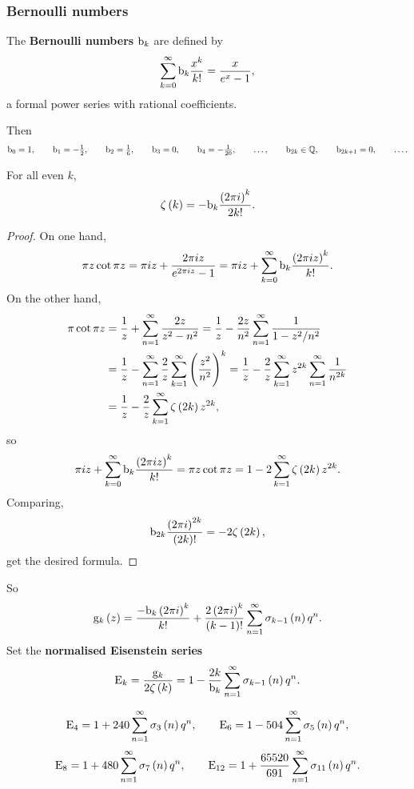 \subsubsection{Bernoulli numbers}

\begin{definition}
The \textbf{Bernoulli numbers} $ \mathrm{b}_k $ are defined by
$$ \sum_{k = 0}^\infty \mathrm{b}_k\dfrac{x^k}{k!} = \dfrac{x}{e^x - 1}, $$
a formal power series with rational coefficients.
\end{definition}

Then
$$ \mathrm{b}_0 = 1, \qquad \mathrm{b}_1 = -\tfrac{1}{2}, \qquad \mathrm{b}_2 = \tfrac{1}{6}, \qquad \mathrm{b}_3 = 0, \qquad \mathrm{b}_4 = -\tfrac{1}{20}, \qquad \dots, \qquad \mathrm{b}_{2k} \in \mathbb{Q}, \qquad \mathrm{b}_{2k + 1} = 0, \qquad \dots. $$

\pagebreak

\begin{proposition}
For all even $ k $,
$$ \zeta\br{k} = -\b_k\dfrac{\br{2\pi i}^k}{2k!}. $$
\end{proposition}

\begin{proof}
On one hand,
$$ \pi z\cot \pi z = \pi iz + \dfrac{2\pi iz}{e^{2\pi iz} - 1} = \pi iz + \sum_{k = 0}^\infty \b_k\dfrac{\br{2\pi iz}^k}{k!}. $$
On the other hand,
\begin{align*}
\pi\cot \pi z
& = \dfrac{1}{z} + \sum_{n = 1}^\infty \dfrac{2z}{z^2 - n^2}
= \dfrac{1}{z} - \dfrac{2z}{n^2}\sum_{n = 1}^\infty \dfrac{1}{1 - z^2 / n^2} \\
& = \dfrac{1}{z} - \sum_{n = 1}^\infty \dfrac{2}{z}\sum_{k = 1}^\infty \br{\dfrac{z^2}{n^2}}^k
= \dfrac{1}{z} - \dfrac{2}{z}\sum_{k = 1}^\infty z^{2k}\sum_{n = 1}^\infty \dfrac{1}{n^{2k}} \\
& = \dfrac{1}{z} - \dfrac{2}{z}\sum_{k = 1}^\infty \zeta\br{2k}z^{2k},
\end{align*}
so
$$ \pi iz + \sum_{k = 0}^\infty \b_k\dfrac{\br{2\pi iz}^k}{k!} = \pi z\cot \pi z = 1 - 2\sum_{k = 1}^\infty \zeta\br{2k}z^{2k}. $$
Comparing,
$$ \b_{2k}\dfrac{\br{2\pi i}^{2k}}{\br{2k}!} = -2\zeta\br{2k}, $$
get the desired formula.
\end{proof}

So
$$ \g_k\br{z} = \dfrac{-\b_k\br{2\pi i}^k}{k!} + \dfrac{2\br{2\pi i}^k}{\br{k - 1}!}\sum_{n = 1}^\infty \sigma_{k - 1}\br{n}q^n. $$
Set the \textbf{normalised Eisenstein series}
$$ \E_k = \dfrac{\g_k}{2\zeta\br{k}} = 1 - \dfrac{2k}{\b_k}\sum_{n = 1}^\infty \sigma_{k - 1}\br{n}q^n. $$

\begin{example*}
$$ \E_4 = 1 + 240\sum_{n = 1}^\infty \sigma_3\br{n}q^n, \qquad \E_6 = 1 - 504\sum_{n = 1}^\infty \sigma_5\br{n}q^n, $$
$$ \E_8 = 1 + 480\sum_{n = 1}^\infty \sigma_7\br{n}q^n, \qquad \E_{12} = 1 + \dfrac{65520}{691}\sum_{n = 1}^\infty \sigma_{11}\br{n}q^n. $$
\end{example*}

